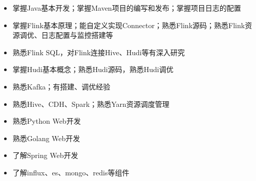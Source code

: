   \begin{itemize}[leftmargin=*]
    \item 掌握Java基本开发；掌握Maven项目的编写和发布；掌握项目日志的配置
    \item 掌握Flink基本原理；能自定义实现Connector；熟悉Flink源码；熟悉Flink资源调优、日志配置与监控搭建等
    \item 熟悉Flink SQL，对Flink连接Hive、Hudi等有深入研究
    \item 掌握Hudi基本概念；熟悉Hudi源码，熟悉Hudi调优
    \item 熟悉Kafka；有搭建、调优经验
    \item 熟悉Hive、CDH、Spark；熟悉Yarn资源调度管理
    \item 熟悉Python Web开发
    \item 熟悉Golang Web开发
    \item 了解Spring Web开发
    \item 了解influx、es、mongo、redis等组件
  \end{itemize}